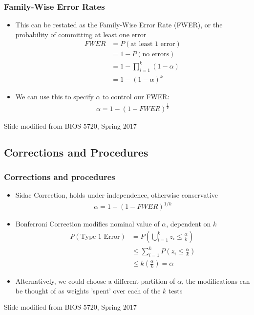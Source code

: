 \documentclass[11pt]{beamer}
\begin{document}
\begin{frame}
\frametitle{Family-Wise Error Rates}
{
\begin{itemize}
\item This can be restated as the Family-Wise Error Rate (FWER), or the probability of committing at least one error
\begin{align*}
FWER &= P(\text{at least 1 error}) \\[4pt]
&= 1 - P(\text{no errors}) \\[4pt]
&= 1 - \prod_{i=1}^k (1 - \alpha) \\[4pt]
&= 1 - (1 - \alpha)^k
\end{align*} 
\item We can use this to specify $\alpha$ to control our FWER:
\begin{align*}
\alpha = 1 - (1 - FWER)^{\frac{1}{k}}
\end{align*}
\end{itemize}
}
\tiny{Slide modified from BIOS 5720, Spring 2017}
\end{frame}

\subsection{Corrections and Procedures}

\begin{frame}
\frametitle{Corrections and procedures}
{\small
\begin{itemize}
\item Sidac Correction, holds under independence, otherwise conservative
\begin{align*}
\alpha = 1 - (1 - FWER)^{1/k}
\end{align*}
\item Bonferroni Correction modifies nominal value of $\alpha$, dependent on $k$
\begin{align*}
P(\text{Type 1 Error}) &= P\left( \bigcup_{i=1}^k z_i \leq \frac{\alpha}{k} \right) \\[6pt]
&\leq \sum_{i=1}^k P \left(  z_i \leq \frac{\alpha}{k} \right) \\[6pt]
&\leq k \left( \frac{\alpha}{k} \right) = \alpha
\end{align*}
\item Alternatively, we could choose a different partition of $\alpha$, the modifications can be thought of as weights 'spent' over each of the $k$ tests
\end{itemize}
\tiny{Slide modified from BIOS 5720, Spring 2017}
}
\end{frame}
\end{document}

